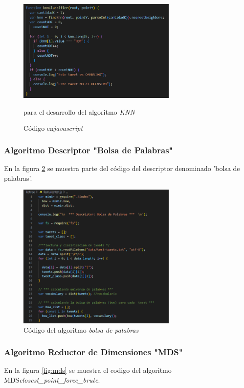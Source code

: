\documentclass{article}
\begin{document}
\begin{figure}[h!]
	\centering
	\includegraphics[width=0.7\textwidth]{img/knn_03.png}
	\caption{Código en\textit{javascript}} para el desarrollo del algoritmo \textit{KNN}
	\label{fig:knn_03}
\end{figure}

\clearpage
\subsubsection{Algoritmo Descriptor "Bolsa de Palabras"}
En la figura \ref{fig:bolsa_palabras} se muestra parte del código del descriptor denominado 'bolsa de palabras'.

\begin{figure}[h!]
	\centering
	\includegraphics[width=0.7\textwidth]{img/bolsa_palabras.png}
	\caption{Código del algoritmo \textit{bolsa de palabras}}
	\label{fig:bolsa_palabras}
\end{figure}

\clearpage
\subsubsection{Algoritmo Reductor de Dimensiones "MDS"}
En la figura \ref{fig:mds} se muestra el codigo del algoritmo MDS\textit{closest\_point\_force\_brute}.
\end{document}
